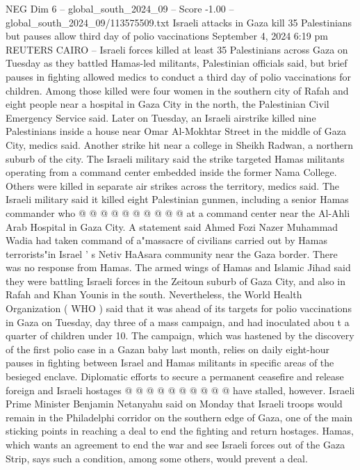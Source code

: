\begin{textsample}{NEG Dim 6 – global\_south\_2024\_09 – Score -1.00 – global\_south\_2024\_09/113575509.txt}  \label{ex:f6_neg_012}
Israeli attacks in Gaza kill 35 Palestinians but pauses allow third day of polio vaccinations September 4, 2024 6:19 pm REUTERS CAIRO -- Israeli forces killed at least 35 Palestinians across Gaza on Tuesday as they battled Hamas-led militants, Palestinian officials said, but brief pauses in fighting allowed medics to conduct a third day of polio vaccinations for children.
Among those killed were four women in the southern city of Rafah and eight people near a hospital in Gaza City in the north, the Palestinian Civil Emergency Service said.
Later on Tuesday, an Israeli airstrike killed nine Palestinians inside a house near Omar Al-Mokhtar Street in the middle of Gaza City, medics said.
Another strike hit near a college in Sheikh Radwan, a northern suburb of the city.
The Israeli military said the strike targeted Hamas militants operating from a command center embedded inside the former Nama College.
Others were killed in separate air strikes across the territory, medics said.
The Israeli military said it killed eight Palestinian gunmen, including a senior Hamas commander who @ @ @ @ @ @ @ @ @ @ at a command center near the Al-Ahli Arab Hospital in Gaza City.
A statement said Ahmed Fozi Nazer Muhammad Wadia had taken command of a"massacre of civilians carried out by Hamas terrorists"in Israel ' s Netiv HaAsara community near the Gaza border.
There was no response from Hamas.
The armed wings of Hamas and Islamic Jihad said they were battling Israeli forces in the Zeitoun suburb of Gaza City, and also in Rafah and Khan Younis in the south.
Nevertheless, the World Health Organization ( WHO ) said that it was ahead of its targets for polio vaccinations in Gaza on Tuesday, day three of a mass campaign, and had inoculated abou t a quarter of children under 10.
The campaign, which was hastened by the discovery of the first polio case in a Gazan baby last month, relies on daily eight-hour pauses in fighting between Israel and Hamas militants in specific areas of the besieged enclave.
Diplomatic efforts to secure a permanent ceasefire and release foreign and Israeli hostages @ @ @ @ @ @ @ @ @ @ have stalled, however.
Israeli Prime Minister Benjamin Netanyahu said on Monday that Israeli troops would remain in the Philadelphi corridor on the southern edge of Gaza, one of the main sticking points in reaching a deal to end the fighting and return hostages.
Hamas, which wants an agreement to end the war and see Israeli forces out of the Gaza Strip, says such a condition, among some others, would prevent a deal.

\end{textsample}
